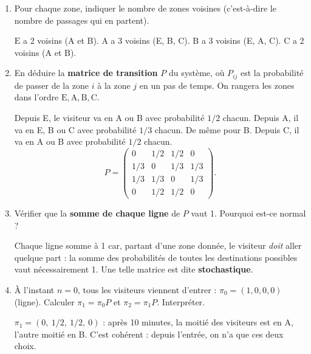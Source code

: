 \begin{enumerate}[label=\alph*), itemsep=0.6em]
  \item Pour chaque zone, indiquer le nombre de zones voisines (c'est-à-dire le nombre de passages qui en partent).

\begin{solution}
$\mathrm{E}$ a 2 voisins (A et B). $\mathrm{A}$ a 3 voisins (E, B, C). $\mathrm{B}$ a 3 voisins (E, A, C). $\mathrm{C}$ a 2 voisins (A et B).
\end{solution}

  \item En déduire la \textbf{matrice de transition} $P$ du système, où $P_{ij}$ est la probabilité de passer de la zone $i$ à la zone $j$ en un pas de temps. On rangera les zones dans l'ordre $\mathrm{E}, \mathrm{A}, \mathrm{B}, \mathrm{C}$.

\begin{solution}
Depuis E, le visiteur va en A ou B avec probabilité $1/2$ chacun. Depuis A, il va en E, B ou C avec probabilité $1/3$ chacun. De même pour B. Depuis C, il va en A ou B avec probabilité $1/2$ chacun.
\[
  P = \begin{pmatrix}
    0 & 1/2 & 1/2 & 0 \\
    1/3 & 0 & 1/3 & 1/3 \\
    1/3 & 1/3 & 0 & 1/3 \\
    0 & 1/2 & 1/2 & 0
  \end{pmatrix}.
\]
\end{solution}

  \item Vérifier que la \textbf{somme de chaque ligne} de $P$ vaut 1. Pourquoi est-ce normal ?

\begin{solution}
Chaque ligne somme à 1 car, partant d'une zone donnée, le visiteur \emph{doit} aller quelque part : la somme des probabilités de toutes les destinations possibles vaut nécessairement 1. Une telle matrice est dite \textbf{stochastique}.
\end{solution}

  \item À l'instant $n = 0$, tous les visiteurs viennent d'entrer : $\pi_0 = (1, 0, 0, 0)$ (ligne). Calculer $\pi_1 = \pi_0 P$ et $\pi_2 = \pi_1 P$. Interpréter.

\begin{solution}
$\pi_1 = (0,\ 1/2,\ 1/2,\ 0)$ : après 10 minutes, la moitié des visiteurs est en A, l'autre moitié en B. C'est cohérent : depuis l'entrée, on n'a que ces deux choix.


\end{solution}
\end{enumerate}
